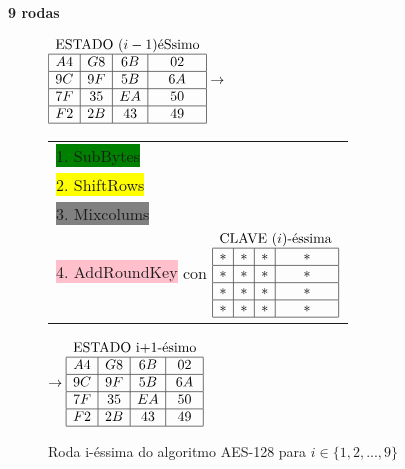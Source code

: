 \begin{center}{\bf 9 rodas}\end{center}
\begin{figure}[!ht]
\begin{figurebox}
\begin{center}
$\begin{array}{|c|c|c|c|}
\multicolumn{4}{c}{\text{ESTADO $(i-1)$éSsimo}}\\\hline
A4 & G8 & 6B & 02\\\hline
9C & 9F & 5B & 6A\\\hline
7F & 35 & EA & 50\\\hline
F2 & 2B & 43 & 49\\\hline
\end{array}\rightarrow$
\begin{tabular}{l}
\\
\colorbox{green}{1. SubBytes}\\
\colorbox{yellow}{2. ShiftRows}\\
\colorbox{gray}{3. Mixcolums } \\
\colorbox{pink}{4. AddRoundKey} con 
\tiny{
$\begin{array}{|c|c|c|c|}
\multicolumn{4}{c}{\text{CLAVE $(i)$-éssima}}\\\hline
* & * & * & *\\\hline
* & * & * & *\\\hline
* & * & * & *\\\hline
* & * & * & *\\\hline
\end{array}$
}
\\
\end{tabular} $\rightarrow
\begin{array}{|c|c|c|c|}
\multicolumn{4}{c}{\text{ESTADO i+1-ésimo}}\\\hline
A4 & G8 & 6B & 02\\\hline
9C & 9F & 5B & 6A\\\hline
7F & 35 & EA & 50\\\hline
F2 & 2B & 43 & 49\\\hline
\end{array}
$
\end{center}\caption{Roda i-éssima do algoritmo AES-128 para $i\in\{1,2,...,9\}$}\label{fig:inputaes2}
\end{figurebox}
\end{figure}

